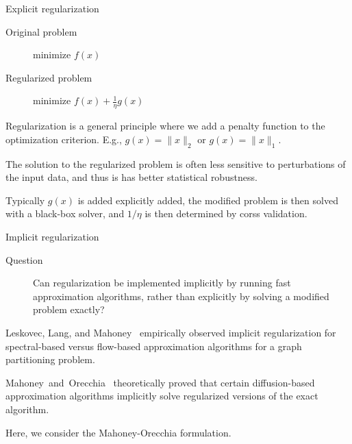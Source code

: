 \documentclass[xcolor=dvipsnames]{beamer}
\begin{document}
\begin{frame}
  \begin{block}{Explicit regularization}
  \begin{description}
    \item[Original problem] minimize $f(x)$
    \item[Regularized problem] minimize $f(x) + \frac{1}{\eta} g(x)$
  \end{description}
  \end{block}

  Regularization is a general principle where we add a penalty function to
  the optimization criterion.  E.g., $g(x) = \|x\|_2$ or $g(x) = \|x\|_1$.

  The solution to the regularized problem is often less sensitive to 
  perturbations of the input data, and thus is has better statistical 
  robustness.
  
  Typically $g(x)$ is added explicitly added, the modified problem is then
  solved with a black-box solver, and $1/\eta$ is then determined by corss 
  validation.
\end{frame}


\begin{frame}
  \begin{block}{Implicit regularization}
  \begin{description}
    \item[Question] Can regularization be implemented implicitly by running
                    fast approximation algorithms, rather than explicitly by
                    solving a modified problem exactly?
  \end{description}
  \end{block}

Leskovec, Lang, and Mahoney~\cite{LLM10_communities_CONF} empirically 
observed implicit regularization for spectral-based versus flow-based 
approximation algorithms for a graph partitioning problem.

Mahoney~and~Orecchia~\cite{MO11-implementing} theoretically proved that 
certain diffusion-based approximation algorithms implicitly solve regularized 
versions of the exact algorithm.

Here, we consider the Mahoney-Orecchia formulation.

\end{frame}
\end{document}
